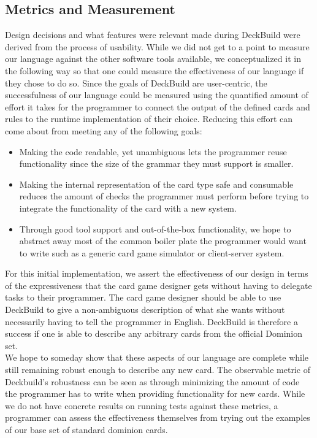 \subsection{Metrics and Measurement}
Design decisions and what features were relevant made during DeckBuild were derived from the process of usability. While we did not get
 to a point to measure our language against the other software tools available, we conceptualized it in the following way so that one could
 measure the effectiveness of our language if they chose to do so.
Since the goals of DeckBuild are user-centric, the successfulness of our language could be measured using the quantified
amount of effort it takes for the programmer to connect the output of the defined cards and rules to the runtime implementation of their
choice. Reducing this effort can come about from meeting any of the following goals:
\begin{itemize}
\item Making the code readable, yet unambiguous
lets the programmer reuse functionality since the size of the grammar they must support is smaller.
\item Making the internal representation of
the card type safe and consumable reduces the amount of checks the programmer must perform before trying to integrate the functionality of
the card with a new system.
\item Through good tool support and out-of-the-box functionality, we hope to abstract away most of the common
boiler plate the programmer would want to write such as a generic card game simulator or client-server system.
\end{itemize}
For this initial implementation, we assert the effectiveness of our design in terms of the expressiveness that the card game designer gets
without having to delegate tasks to their programmer. The card game designer should be able to use DeckBuild to give a non-ambiguous
description of what she wants without necessarily having to tell the programmer in English.
DeckBuild is therefore a success if one is able to describe any arbitrary cards from the
official Dominion set.
\\
We hope to someday show that these aspects of our language are complete while still remaining robust enough to describe any
new card. The observable metric of Deckbuild's robustness can be seen as through minimizing the amount of code the programmer has to
write when providing functionality for new cards. While we do not have concrete results on running tests against
these metrics, a programmer can assess the effectiveness themselves from trying out the examples of our base set of standard dominion cards.
